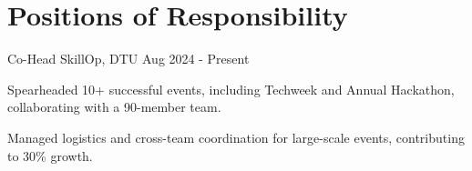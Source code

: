\documentclass[a4paper,10pt]{article}
\begin{document}
\section{Positions of Responsibility}


\resumeSubheading
{Co-Head}
{}
{SkillOp, DTU}
{Aug 2024 - Present}

\resumeItemListStart
\item Spearheaded 10+ successful events, including Techweek and Annual Hackathon, collaborating with a 90-member team.
\item Managed logistics and cross-team coordination for large-scale events, contributing to 30\% growth.
\resumeItemListEnd




\vfill
{}
\end{document}
